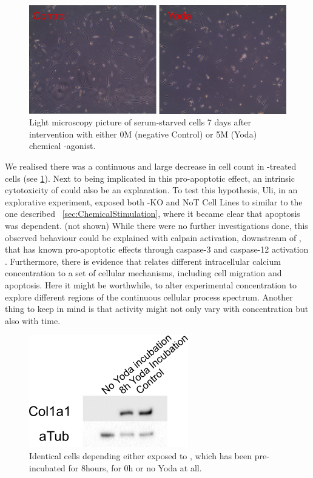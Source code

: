 \begin{figure}
	\centering
	\includegraphics[width = \linewidth]{Yoda_Apoptosis.png}
	\caption{Light microscopy picture of serum-starved cells 7 days after intervention with either 0\textmu{}M (negative Control) or 5\textmu{}M (Yoda) chemical \Piezo{}-agonist.}
	\label{pic:Yoda_Apop}
\end{figure}

We realised there was a continuous and large decrease in cell count in \Yoda{}-treated cells (see \ref{pic:Yoda_Apop}). Next to \Piezo{} being implicated in this pro-apoptotic effect, an intrinsic cytotoxicity of \Yoda{} could also be an explanation. To test this hypothesis, Uli, in an explorative experiment, exposed both \Piezo{}-KO and NoT Cell Lines to \Yoda{} similar to the one described ~\vref{sec:ChemicalStimulation}, where it became clear that apoptosis was \Piezo{} dependent. (not shown) While there were no further investigations done, this observed behaviour could be explained with calpain activation, downstream of \Piezo{}, that has known pro-apoptotic effects through caspase-3 and caspase-12 activation \cite{Nakagawa2000, Altznauer2004}. Furthermore, there is evidence that relates different intracellular calcium concentration to a set of cellular mechanisms, including cell migration and apoptosis. Here it might be worthwhile, to alter experimental \Yoda{} concentration to explore different regions of the continuous cellular process spectrum. Another thing to keep in mind is that \Yoda{} activity might not only vary with concentration but also with time.

\begin{figure}
	\centering
	\includegraphics[width = 0.4\linewidth{}]{Inkubationshypothese.png}
	\caption{Identical cells depending either exposed to \Yoda{}, which has been pre-incubated for 8hours, for 0h or no Yoda at all.}
	\label{fig:Inkubationshypothese_Western}
\end{figure}

